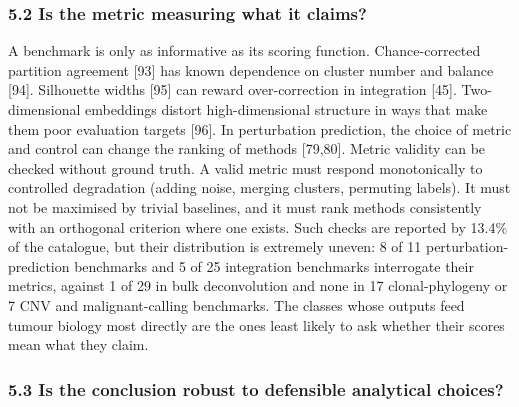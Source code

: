 \documentclass[11pt]{article}
\begin{document}
\subsubsection{5.2 Is the metric measuring what it
claims?}\label{is-the-metric-measuring-what-it-claims}

A benchmark is only as informative as its scoring function.
Chance-corrected partition agreement {[}93{]} has known dependence on
cluster number and balance {[}94{]}. Silhouette widths {[}95{]} can
reward over-correction in integration {[}45{]}. Two-dimensional
embeddings distort high-dimensional structure in ways that make them
poor evaluation targets {[}96{]}. In perturbation prediction, the choice
of metric and control can change the ranking of methods {[}79,80{]}.
Metric validity can be checked without ground truth. A valid metric must
respond monotonically to controlled degradation (adding noise, merging
clusters, permuting labels). It must not be maximised by trivial
baselines, and it must rank methods consistently with an orthogonal
criterion where one exists. Such checks are reported by 13.4\% of the
catalogue, but their distribution is extremely uneven: 8 of 11
perturbation-prediction benchmarks and 5 of 25 integration benchmarks
interrogate their metrics, against 1 of 29 in bulk deconvolution and
none in 17 clonal-phylogeny or 7 CNV and malignant-calling benchmarks.
The classes whose outputs feed tumour biology most directly are the ones
least likely to ask whether their scores mean what they claim.

\subsubsection{5.3 Is the conclusion robust to defensible analytical
choices?}\label{is-the-conclusion-robust-to-defensible-analytical-choices}
\end{document}
